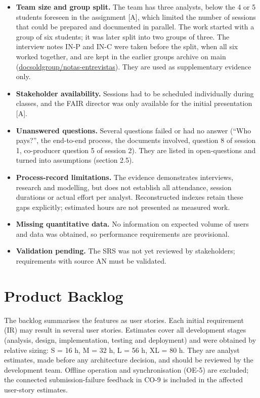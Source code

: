 \documentclass[11pt,a4paper]{article}
\begin{document}
\begin{itemize}
  \item \textbf{Team size and group split.} The team has three analysts, below the 4 or 5 students foreseen in the assignment [A], which limited the number of sessions that could be prepared and documented in parallel. The work started with a group of six students; it was later split into two groups of three. The interview notes IN-P and IN-C were taken before the split, when all six worked together, and are kept in the earlier group\textquotesingle s archive on main (\url{docsoldgroup/notas-entrevistas}). They are used as supplementary evidence only.
  \item \textbf{Stakeholder availability.} Sessions had to be scheduled individually during classes, and the FAIR director was only available for the initial presentation [A].
  \item \textbf{Unanswered questions.} Several questions failed or had no answer (``Who pays?'', the end-to-end process, the documents involved, question 8 of session 1, co-producer question 5 of session 2). They are listed in open-questions and turned into assumptions (section 2.5).
  \item \textbf{Process-record limitations.} The evidence demonstrates interviews, research and modelling, but does not establish all attendance, session durations or actual effort per analyst. Reconstructed indexes retain these gaps explicitly; estimated hours are not presented as measured work.
  \item \textbf{Missing quantitative data.} No information on expected volume of users and data was obtained, so performance requirements are provisional.
  \item \textbf{Validation pending.} The SRS was not yet reviewed by stakeholders; requirements with source AN must be validated.
\end{itemize}

\section{Product Backlog}

The backlog summarises the features as user stories. Each initial requirement (IR) may result in several user stories. Estimates cover all development stages (analysis, design, implementation, testing and deployment) and were obtained by relative sizing: S = 16 h, M = 32 h, L = 56 h, XL = 80 h. They are analyst estimates, made before any architecture decision, and should be reviewed by the development team. Offline operation and synchronisation (OE-5) are excluded; the connected submission-failure feedback in CO-9 is included in the affected user-story estimates.
\end{document}

